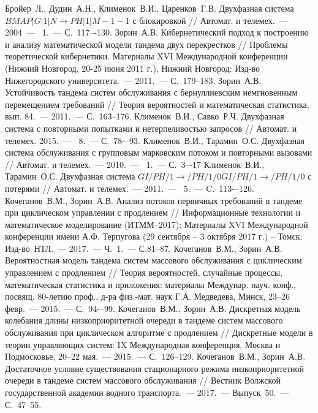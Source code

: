 \documentclass[11pt]{ubs}
\begin{document}
\begin{thebibliography}{100}
 Бройер~Л., Дудин~А.Н., Клименок~В.И., Царенков~Г.В. Двухфазная система $BMAP|G|1|N \to PH|1|M-1-1$ с блокировкой // Автомат. и телемех.~--- 2004~--- \No{}~1.~--- С.~117–-130.
 Зорин~А.В. Кибернетический подход к построению и анализу математической модели тандема двух перекрестков // Проблемы теоретической кибернетики. Материалы XVI Международной конференции (Нижний Новгород, 20-25 июня 2011 г.), Нижний Новгород: Изд-во Нижегородского университета.~--- 2011.~--- С.~179--183.
 Зорин~А.В. Устойчивость тандема систем обслуживания с бернуллиевским немгновенным перемещением требований // Теория вероятностей и математическая статистика, вып. 84.~--- 2011.~--- С.~163--176.
 Клименок~В.И., Савко~Р.Ч. Двухфазная система с повторными попытками и нетерпеливостью запросов // Автомат. и телемех. 2015.~--- \No{}~8.~--- С.~78-–93. 
 Клименок~В.И., Тарамин~О.С. Двухфазная система обслуживания с групповым марковским потоком и повторными вызовами // Автомат. и телемех.~--- 2010.~--- \No~1.~--- С.~3–-17 
 Клименок~В.И., Тарамин~О.С. Двухфазная система $GI/PH/1 \to /PH/1/0GI/PH/1 \to /PH/1/0$ с потерями // Автомат. и телемех.~--- 2011.~--- \No{}~5.~--- C.~113-–126.
 Кочеганов~В.М., Зорин~А.В. Анализ потоков первичных требований в тандеме при циклическом управлении с продлением // Информационные технологии и математическое моделирование (ИТММ--2017): Материалы XVI Международной конференции имени А.Ф. Терпугова (29 сентября -- 3 октября 2017 г.) -- Томск: Изд-во~НТЛ.~--- 2017.~--- Ч.~1.~--- С.81--87.
 Кочеганов~В.М., Зорин~А.В. Вероятностная модель тандема систем массового обслуживания с циклическим управлением с продлением // Теория вероятностей, случайные процессы, математическая статистика и приложения: материалы Междунар. науч. конф., посвящ. 80-летию проф., д-ра физ.-мат. наук Г.А. Медведева, Минск, 23–26 февр.~--- 2015.~--- С.~94-–99.
 Кочеганов~В.М., Зорин~А.В. Дискретная модель колебания длины низкоприоритетной очереди в тандеме систем массового обслуживания при циклическом алгоритме с продлением // Дискретные модели в теории управляющих систем: IX Международная конференция, Москва и Подмосковье, 20–22 мая.~--- 2015.~--- С.~126--129.
 Кочеганов~В.М., Зорин~А.В. Достаточное условие существования стационарного режима низкоприоритетной очереди в тандеме систем массового обслуживания // Вестник Волжской государственной академии водного транспорта.~--- 2017.~--- Выпуск~50.~--- С.~47--55.

\end{thebibliography}
\end{document}
